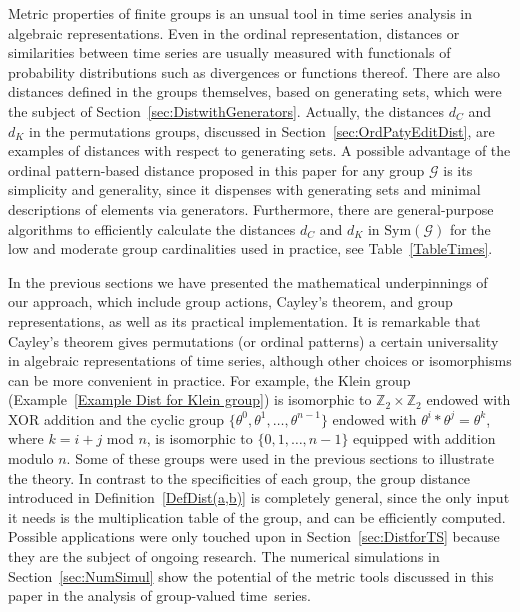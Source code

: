 \documentclass{article}
\begin{document}
Metric properties of finite groups is an unsual tool in time series analysis
in algebraic representations. Even in the ordinal representation, distances
or similarities between time series are usually measured with functionals of
probability distributions such as divergences or functions thereof. There
are also distances defined in the groups themselves, based on generating
sets, which were the subject of Section~\ref{sec:DistwithGenerators}.
Actually, the distances $d_{C}$ and $d_{K}$ in the permutations groups,
discussed in Section~\ref{sec:OrdPatyEditDist}, are examples of distances
with respect to generating sets. A possible advantage of the ordinal
pattern-based distance proposed in this paper for any group $\mathcal{G}$ is
its simplicity and generality, since it dispenses with generating sets and
minimal descriptions of elements via generators. Furthermore, there are
general-purpose algorithms to efficiently calculate the distances $d_{C}$
and $d_{K}$ in $\mathrm{Sym}(\mathcal{G})$ for the low and moderate group
cardinalities used in practice, see Table~\ref{TableTimes}.

In the previous sections we have presented the mathematical underpinnings of our approach, which include group actions, Cayley's theorem, and group representations, as well as its practical implementation. It is remarkable that Cayley's theorem gives permutations (or ordinal patterns) a certain universality in algebraic representations of time series, although other
choices or isomorphisms can be more convenient in practice. For example, the Klein group (Example~\ref{Example Dist for Klein group}) is isomorphic to $\mathbb{Z}_{2}\times \mathbb{Z}_{2}$ endowed with XOR addition and the cyclic group $\{\theta ^{0},\theta ^{1},\ldots,\theta ^{n-1}\}$ endowed with $\theta ^{i}\ast \theta ^{j}=\theta ^{k}$, where $k=i+j$ \textrm{mod} $n$, is
isomorphic to $\{0,1,\ldots,n-1\}$ equipped with addition modulo $n$. Some of these groups were used in the previous sections to illustrate the theory. In contrast to the specificities of each group, the group distance introduced in Definition~\ref{DefDist(a,b)} is completely general, since the only input it needs is the multiplication table of the group, and can be efficiently computed. Possible applications were only touched upon in
Section~\ref{sec:DistforTS} because they are the subject of ongoing
research. The numerical simulations in Section~\ref{sec:NumSimul} show the potential of the metric tools discussed in this paper in the analysis of group-valued \mbox{time series}.
\end{document}
